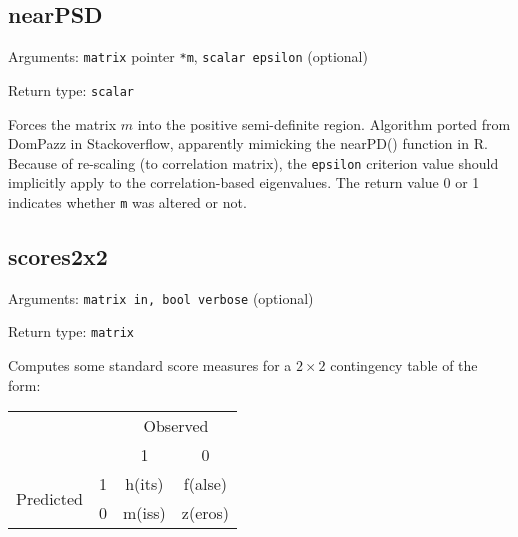 \documentclass[11pt,english]{article}
\providecommand{\tabularnewline}{\\}
\begin{document}
\subsection{nearPSD}

Arguments: \texttt{matrix} pointer \texttt{{*}m}, \texttt{scalar epsilon}
(optional) 

\noindent Return type: \texttt{scalar}

Forces the matrix $m$ into the positive semi-definite region. Algorithm
ported from \textquotedbl DomPazz\textquotedbl{} in Stackoverflow,
apparently mimicking the nearPD() function in R. Because of re-scaling
(to correlation matrix), the \texttt{epsilon} criterion value should
implicitly apply to the correlation-based eigenvalues. The return
value 0 or 1 indicates whether \texttt{m} was altered or not. 

\subsection{scores2x2}

Arguments: \texttt{matrix in, bool verbose} (optional)

\noindent Return type: \texttt{matrix}

Computes some standard score measures for a $2\times 2$ contingency
table of the form:

\begin{tabular}{cccc}
\toprule 
 &  & \multicolumn{2}{c}{Observed}\tabularnewline
 &  & 1 & 0\tabularnewline
\midrule
\multirow{2}{*}{Predicted} & 1 & h(its) & f(alse)\tabularnewline
 & 0 & m(iss) & z(eros)\tabularnewline
\bottomrule
\end{tabular}
\end{document}
